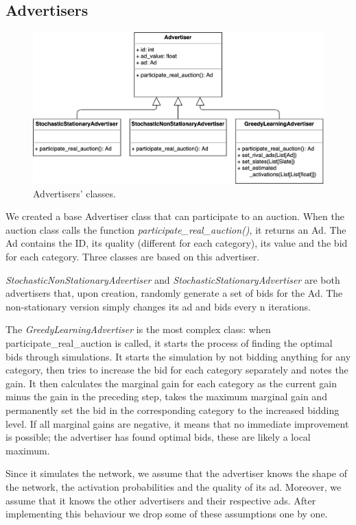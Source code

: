 \documentclass{article}
\begin{document}
\subsection{Advertisers}

\begin{figure}[H]
    \centering
    \includegraphics[width=0.66\linewidth]{images/advertisers-uml.png}
    \caption{Advertisers' classes.}
    \label{fig:vadvertisers-uml}
\end{figure}

We created a base Advertiser class that can participate to an auction. When the auction class calls the function \emph{participate\_real\_auction()}, it returns an Ad. The Ad contains the ID, its quality (different for each category), its value and the bid for each category.
Three classes are based on this advertiser.

\emph{StochasticNonStationaryAdvertiser} and \emph{StochasticStationaryAdvertiser} are both advertisers that, upon creation, randomly generate a set of bids for the Ad. The non-stationary version simply changes its ad and bids every n iterations.

The \emph{GreedyLearningAdvertiser} is the most complex class: when participate\_real\_auction is called, it starts the process of finding the optimal bids through simulations. It starts the simulation by not bidding anything for any category, then tries to increase the bid for each category separately and notes the gain.
It then calculates the marginal gain for each category as the current gain minus the gain in the preceding step, takes the maximum marginal gain and permanently set the bid in the corresponding category to the increased bidding level.
If all marginal gains are negative, it means that no immediate improvement is possible; the advertiser has found optimal bids, these are likely a local maximum.

Since it simulates the network, we assume that the advertiser knows the shape of the network, the activation probabilities and the quality of its ad. Moreover, we assume that it knows the other advertisers and their respective ads. After implementing this behaviour we drop some of these assumptions one by one.
\end{document}
